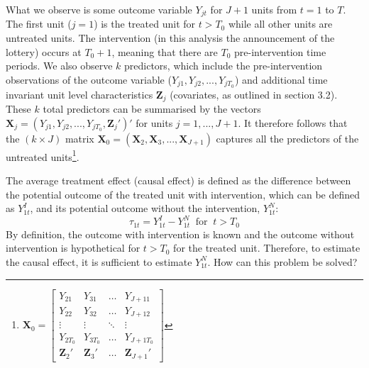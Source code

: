 \documentclass{scrbook}
\begin{document}
What we observe is some outcome variable \(Y_{jt}\) for \(J + 1\) units
from \(t=1\) to \(T\). The first unit (\(j = 1\)) is the treated unit
for \(t>T_{0}\) while all other units are untreated units. The
intervention (in this analysis the announcement of the lottery) occurs
at \(T_{0}+1\), meaning that there are \(T_{0}\) pre-intervention time
periods. We also observe \(k\) predictors, which include the
pre-intervention observations of the outcome variable
(\(Y_{j1},Y_{j2},...,Y_{jT_{0}}\)) and additional time invariant unit
level characteristics \(\mathbf{Z}_{j}\) (covariates, as outlined in
section 3.2). These \(k\) total predictors can be summarised by the
vectors
\(\mathbf{X}_{j}=(Y_{j1},Y_{j2},...,Y_{jT_{0}},\mathbf{Z}_{j}')'\) for
units \(j=1,...,J + 1\). It therefore follows that the \((k\times J)\)
matrix
\(\mathbf{X}_{0}=(\mathbf{X}_{2},\mathbf{X}_{3},...,\mathbf{X}_{J + 1})\)
captures all the predictors of the untreated
units\footnote{\(\mathbf{X}_0=
\begin{bmatrix}
Y_{21} & Y_{31} & \dots & Y_{J+11}\\
Y_{22} & Y_{32} & \dots & Y_{J+12}\\
\vdots & \vdots & \ddots & \vdots\\
Y_{2T_{0}} & Y_{3T_{0}} & \dots & Y_{J+1T_{0}}\\
\mathbf{Z}_{2}' & \mathbf{Z}_{3}' & \dots & \mathbf{Z}_{J + 1}'
\end{bmatrix}\)}.

The average treatment effect (causal effect) is defined as the
difference between the potential outcome of the treated unit with
intervention, which can be defined as \(Y_{1t}^{I}\), and its potential
outcome without the intervention, \(Y_{1t}^{N}\): \begin{equation}
\tau_{1t}=Y_{1t}^{I}-Y_{1t}^{N}\; \; \text{for}\; \; t>T_{0}
\end{equation} By definition, the outcome with intervention is known and
the outcome without intervention is hypothetical for \(t>T_{0}\) for the
treated unit. Therefore, to estimate the causal effect, it is sufficient
to estimate \(Y_{1t}^{N}\). How can this problem be solved?
\end{document}
